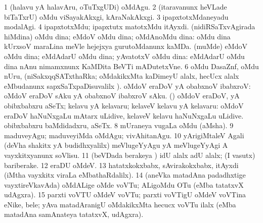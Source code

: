 \noindent
\gl{\pagu}
\bmng
\bnum
\num{1}  (halavu yA halavAru, oTuTxgUDi) oMdAgu. 
\num{2}  (itaravanunx heVLade biTaTxrU) oMdu viSayakAkxgi, kAraNakAkxgi. 
\num{3}  ipapxtotxMdaneyadu modalAgi. 
\num{4}  ipapxtotxMdu; ipapxtutx matotxMdu itAyxdi. 
  
\banum
{} (nidiRSaTxvAgirada hiMdina) oMdu dina; eMdoV oMdu dina; oMdAnoMdu dina:  oMdu dina kUrxsoV maraLina meVle hejejxya gurutoMdanunx kaMDa. 
 (muMde) eMdoV oMdu dina; eMdAdarU oMdu dina; yAvatotxV oMdu dina:  eMdAdarU oMdu dina nAnu nimamxnunx KaMDita BeVTi mADutetxVne. 
\eanum
\numie
\num{6}  oMdu DasaZnf, oMdu nUru, \mo (niSakxqqSATxthaRka; oMdakikxMta kaDimeyU alalx, hecUcx alalx eMbudanunx sapxSaTxpaDisuvalilx \parx). 
  
\banum
{} oMdoV eraDoV yA obabxnoV ibabxroV:  oMdoV eraDoV sAku yA obabxnoV ibabxroV sAku. 
 (\rUpa) oMdoV eraDoV, yA obibxbabxru aSeTx; kelavu yA kelavaru; kelaveV kelavu yA kelavaru:  oMdoV eraDoV haNuNxgaLu mAtarx uLidive, kelaveV kelavu haNuNxgaLu uLidive.  obibxbabxru baMdidadxru, aSeTx. 
\eanum
\numie
\num{8}  mUraneya \mo vugaLa oMdu (aMsha). 
\num{9}  maduveyAgu; maduveyiMda oMdAgu; vivAhitanAgu. 
\num{10}  yArigiMtaleV Agali (deVha shakitx yA budidhxyalilx) meVlugeYyAgu yA meVlugeYyAgi A vayxkitxyanunx soVlisu. 
\num{11}  (beVDada berakeya \vi) idU alalx adU alalx; (I vasutx) bariberake. 
\num{12}  eraDU oMdeV. 
\num{13}  hatatxkokxbabx, sAvirakokxbabx, itAyxdi (iMtha vayxkitx viraLa eMbathaRdalilx). 
\num{14}  (aneVka matadAna padadhxtige vayxtireVkavAda) oMdALige oMde voVTu; ALigoMdu OTu (eMba tatatxvX udAgxra). 
\num{15}  parxti voVTU oMdeV voVTu; parxti voVTigU oMdeV voVTina eNike, bele; yAva matadAranigU oMdakikxMta hecucx voVTu ilalx (eMba matadAna samAnateya tatatxvX, udAgxra). 
\enum
\emng
\eentry

